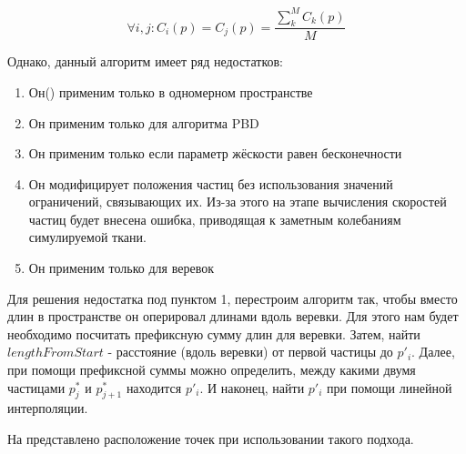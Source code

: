 	\begin{equation} \label{eq:heurV1Idea}
		\forall i,j : C_i(p) = C_j(p) = \frac{\sum_k^M C_k(p)}{M}
	\end{equation}
	
	Однако, данный алгоритм имеет ряд недостатков:
	\begin{enumerate}[1.]
		\item Он() применим только в одномерном пространстве
		\item Он применим только для алгоритма PBD 
		\item Он применим только если параметр жёскости равен бесконечности
		\item Он модифицирует положения частиц без использования значений ограничений, связывающих их. Из-за этого на этапе вычисления скоростей частиц будет внесена ошибка, приводящая к заметным колебаниям симулируемой ткани.
		\item Он применим только для веревок
	\end{enumerate}
	
	Для решения недостатка под пунктом 1, перестроим алгоритм так, чтобы вместо длин в пространстве он оперировал длинами вдоль веревки. Для этого нам будет необходимо посчитать префиксную сумму длин для веревки. Затем, найти $lengthFromStart$ - расстояние (вдоль веревки) от первой частицы до $p'_i$. Далее, при помощи префиксной суммы можно определить, между какими двумя частицами $p^*_j$ и $p^*_{j+1}$  находится $p'_i$. И наконец, найти $p'_i$ при помощи линейной интерполяции.
	
	На  представлено расположение точек при использовании такого подхода.
	
